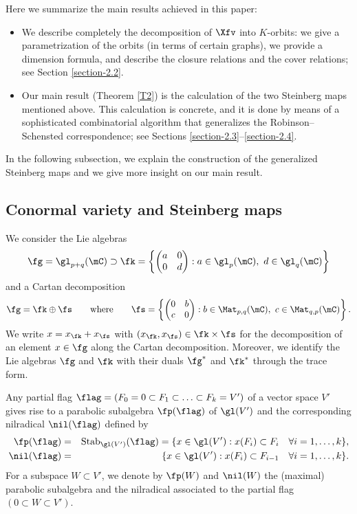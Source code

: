 Here we summarize the main results achieved in this paper:
\begin{itemize}
\item We describe completely the decomposition of $\Xfv$ into $K$-orbits: we give a para\-metrization of the orbits (in terms of certain graphs), we provide a dimension formula, and describe the closure relations and the cover relations; see Section \ref{section-2.2}.
\item Our main result (Theorem \ref{T2}) is the calculation of the two Steinberg maps mentioned above. This calculation is concrete, and it is done by means of a sophisticated combinatorial algorithm that generalizes the Robinson--Schensted correspondence; see Sections \ref{section-2.3}--\ref{section-2.4}.
\end{itemize}
In the following subsection, we explain the construction of the generalized Steinberg maps and we give more insight on our main result.

\subsection{Conormal variety and Steinberg maps}
\label{section-1.2}
We consider the Lie algebras
\[
\fg=\gl_{p+q}(\mC)\supset\fk=\left\{\begin{pmatrix} a & 0\\ 0 & d \end{pmatrix}:a\in\gl_p(\mC),\ d\in\gl_q(\mC)\right\}
\]
and a Cartan decomposition
\[
\fg=\fk\oplus\fs\qquad\mbox{where}\qquad\fs=\left\{\begin{pmatrix} 0 & b\\ c & 0 \end{pmatrix}:b\in\Mat_{p,q}(\mC),\ c\in\Mat_{q,p}(\mC)\right\}.
\]
We write $x=x_\fk+x_\fs$ with $(x_\fk,x_\fs)\in\fk\times\fs$ for the decomposition of an element $x\in\fg$ along the Cartan decomposition.
Moreover, we identify the Lie algebras $\fg$ and $\fk$ with their duals $\fg^*$ and $\fk^*$ through the trace form.

Any partial flag $\flag=(F_0=0\subset F_1\subset\ldots\subset F_k=V')$ of a vector space $V'$ gives rise to a parabolic subalgebra $\fp(\flag)$ of $\gl(V')$ and the corresponding nilradical $\nil(\flag)$ defined by
\begin{eqnarray*}
\fp(\flag) & = & \mathrm{Stab}_{\gl(V')}(\flag)=\{x\in\gl(V'):x(F_i)\subset F_i\quad \forall i=1,\ldots,k\},\\
\nil(\flag) & = & \{x\in\gl(V'):x(F_i)\subset F_{i-1}\quad\forall i=1,\ldots,k\}.
\end{eqnarray*}
For a subspace $W\subset V'$, we denote by $\fp(W)$ and $\nil(W)$ the (maximal) parabolic subalgebra and the nilradical associated to the partial flag $(0\subset W\subset V')$.

